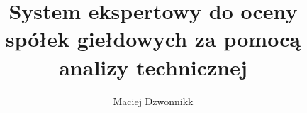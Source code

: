 \documentclass[a4paper,12pt,twoside]{book}
\author{Maciej Dzwonnikk}
\title{System ekspertowy do oceny spółek giełdowych za pomocą analizy technicznej}
\begin{document}
\frontmatter

\tableofcontents

\mainmatter
\pagestyle{headings}










\appendix
\renewcommand{\chaptermark}[1]{%
\markboth{\MakeUppercase{%
DODATEK \thechapter.%
\ }}{}}


\end{document}
